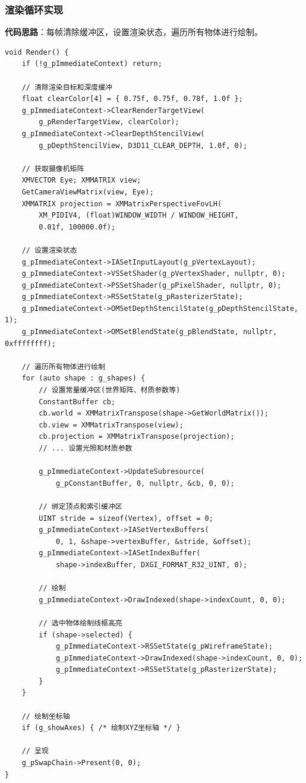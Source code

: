 \documentclass[12pt,a4paper]{article}
\begin{document}
\begin{tcolorbox}
\subsubsection{渲染循环实现}

\textbf{代码思路}：每帧清除缓冲区，设置渲染状态，遍历所有物体进行绘制。

\begin{lstlisting}[caption={主渲染函数}]
void Render() {
    if (!g_pImmediateContext) return;
    
    // 清除渲染目标和深度缓冲
    float clearColor[4] = { 0.75f, 0.75f, 0.78f, 1.0f };
    g_pImmediateContext->ClearRenderTargetView(
        g_pRenderTargetView, clearColor);
    g_pImmediateContext->ClearDepthStencilView(
        g_pDepthStencilView, D3D11_CLEAR_DEPTH, 1.0f, 0);
    
    // 获取摄像机矩阵
    XMVECTOR Eye; XMMATRIX view;
    GetCameraViewMatrix(view, Eye);
    XMMATRIX projection = XMMatrixPerspectiveFovLH(
        XM_PIDIV4, (float)WINDOW_WIDTH / WINDOW_HEIGHT, 
        0.01f, 100000.0f);
    
    // 设置渲染状态
    g_pImmediateContext->IASetInputLayout(g_pVertexLayout);
    g_pImmediateContext->VSSetShader(g_pVertexShader, nullptr, 0);
    g_pImmediateContext->PSSetShader(g_pPixelShader, nullptr, 0);
    g_pImmediateContext->RSSetState(g_pRasterizerState);
    g_pImmediateContext->OMSetDepthStencilState(g_pDepthStencilState, 1);
    g_pImmediateContext->OMSetBlendState(g_pBlendState, nullptr, 0xffffffff);
    
    // 遍历所有物体进行绘制
    for (auto shape : g_shapes) {
        // 设置常量缓冲区(世界矩阵、材质参数等)
        ConstantBuffer cb;
        cb.world = XMMatrixTranspose(shape->GetWorldMatrix());
        cb.view = XMMatrixTranspose(view);
        cb.projection = XMMatrixTranspose(projection);
        // ... 设置光照和材质参数
        
        g_pImmediateContext->UpdateSubresource(
            g_pConstantBuffer, 0, nullptr, &cb, 0, 0);
        
        // 绑定顶点和索引缓冲区
        UINT stride = sizeof(Vertex), offset = 0;
        g_pImmediateContext->IASetVertexBuffers(
            0, 1, &shape->vertexBuffer, &stride, &offset);
        g_pImmediateContext->IASetIndexBuffer(
            shape->indexBuffer, DXGI_FORMAT_R32_UINT, 0);
        
        // 绘制
        g_pImmediateContext->DrawIndexed(shape->indexCount, 0, 0);
        
        // 选中物体绘制线框高亮
        if (shape->selected) {
            g_pImmediateContext->RSSetState(g_pWireframeState);
            g_pImmediateContext->DrawIndexed(shape->indexCount, 0, 0);
            g_pImmediateContext->RSSetState(g_pRasterizerState);
        }
    }
    
    // 绘制坐标轴
    if (g_showAxes) { /* 绘制XYZ坐标轴 */ }
    
    // 呈现
    g_pSwapChain->Present(0, 0);
}
\end{lstlisting}
\end{tcolorbox}
\end{document}

